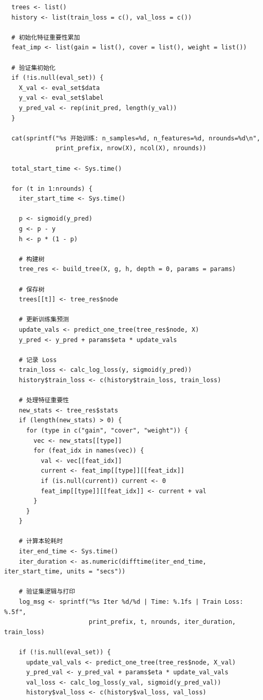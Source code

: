 \documentclass[11pt, a4paper]{article}
\begin{document}
\begin{verbatim}
  trees <- list()
  history <- list(train_loss = c(), val_loss = c())
  
  # 初始化特征重要性累加
  feat_imp <- list(gain = list(), cover = list(), weight = list())
  
  # 验证集初始化
  if (!is.null(eval_set)) {
    X_val <- eval_set$data
    y_val <- eval_set$label
    y_pred_val <- rep(init_pred, length(y_val))
  }
  
  cat(sprintf("%s 开始训练: n_samples=%d, n_features=%d, nrounds=%d\n", 
              print_prefix, nrow(X), ncol(X), nrounds))
  
  total_start_time <- Sys.time()
  
  for (t in 1:nrounds) {
    iter_start_time <- Sys.time()
    
    p <- sigmoid(y_pred)
    g <- p - y
    h <- p * (1 - p)
    
    # 构建树
    tree_res <- build_tree(X, g, h, depth = 0, params = params)
    
    # 保存树
    trees[[t]] <- tree_res$node
    
    # 更新训练集预测
    update_vals <- predict_one_tree(tree_res$node, X)
    y_pred <- y_pred + params$eta * update_vals
    
    # 记录 Loss
    train_loss <- calc_log_loss(y, sigmoid(y_pred))
    history$train_loss <- c(history$train_loss, train_loss)
    
    # 处理特征重要性
    new_stats <- tree_res$stats
    if (length(new_stats) > 0) {
      for (type in c("gain", "cover", "weight")) {
        vec <- new_stats[[type]]
        for (feat_idx in names(vec)) {
          val <- vec[[feat_idx]]
          current <- feat_imp[[type]][[feat_idx]]
          if (is.null(current)) current <- 0
          feat_imp[[type]][[feat_idx]] <- current + val
        }
      }
    }
    
    # 计算本轮耗时
    iter_end_time <- Sys.time()
    iter_duration <- as.numeric(difftime(iter_end_time, iter_start_time, units = "secs"))
    
    # 验证集逻辑与打印
    log_msg <- sprintf("%s Iter %d/%d | Time: %.1fs | Train Loss: %.5f", 
                       print_prefix, t, nrounds, iter_duration, train_loss)
    
    if (!is.null(eval_set)) {
      update_val_vals <- predict_one_tree(tree_res$node, X_val)
      y_pred_val <- y_pred_val + params$eta * update_val_vals
      val_loss <- calc_log_loss(y_val, sigmoid(y_pred_val))
      history$val_loss <- c(history$val_loss, val_loss)
      

\end{verbatim}
\end{document}
